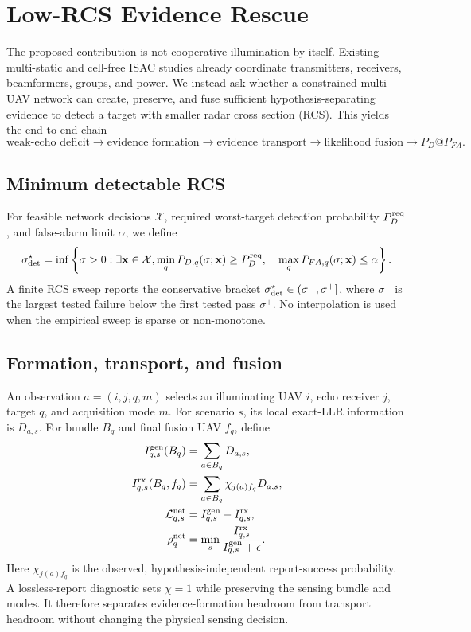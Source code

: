 \section{Low-RCS Evidence Rescue}
\label{sec:low-rcs-rescue}

The proposed contribution is not cooperative illumination by itself. Existing
multi-static and cell-free ISAC studies already coordinate transmitters,
receivers, beamformers, groups, and power. We instead ask whether a constrained
multi-UAV network can create, preserve, and fuse sufficient
hypothesis-separating evidence to detect a target with smaller radar cross
section (RCS). This yields the end-to-end chain
\begin{equation}
\text{weak-echo deficit}\rightarrow\text{evidence formation}
\rightarrow\text{evidence transport}\rightarrow\text{likelihood fusion}
\rightarrow P_D@P_{FA}.
\end{equation}

\subsection{Minimum detectable RCS}

For feasible network decisions $\mathcal X$, required worst-target detection
probability $P_D^{\rm req}$, and false-alarm limit $\alpha$, we define
\begin{equation}
\sigma_{\rm det}^{\star}=\inf\left\{\sigma>0:\exists\mathbf{x}\in\mathcal X,
\min_qP_{D,q}(\sigma;\mathbf{x})\ge P_D^{\rm req},\quad
\max_qP_{FA,q}(\sigma;\mathbf{x})\le\alpha\right\}.
\end{equation}
A finite RCS sweep reports the conservative bracket
$\sigma_{\rm det}^{\star}\in(\sigma^-,\sigma^+]$, where $\sigma^-$ is the
largest tested failure below the first tested pass $\sigma^+$. No interpolation
is used when the empirical sweep is sparse or non-monotone.

\subsection{Formation, transport, and fusion}

An observation $a=(i,j,q,m)$ selects an illuminating UAV $i$, echo receiver
$j$, target $q$, and acquisition mode $m$. For scenario $s$, its local exact-LLR
information is $D_{a,s}$. For bundle $B_q$ and final fusion UAV $f_q$, define
\begin{align}
I_{q,s}^{\rm gen}(B_q)&=\sum_{a\in B_q}D_{a,s},\\
I_{q,s}^{\rm rx}(B_q,f_q)&=\sum_{a\in B_q}
\chi_{j(a)f_q}D_{a,s},\\
\mathcal L_{q,s}^{\rm net}&=I_{q,s}^{\rm gen}-I_{q,s}^{\rm rx},\\
\rho_q^{\rm net}&=\min_s\frac{I_{q,s}^{\rm rx}}
{I_{q,s}^{\rm gen}+\epsilon}.
\end{align}
Here $\chi_{j(a)f_q}$ is the observed, hypothesis-independent report-success
probability. A lossless-report diagnostic sets $\chi=1$ while preserving the
sensing bundle and modes. It therefore separates evidence-formation headroom
from transport headroom without changing the physical sensing decision.

